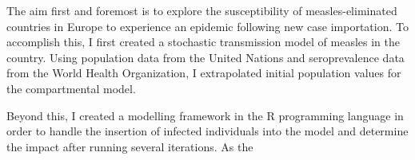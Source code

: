 \documentclass[../Paper.tex]{subfiles}
\begin{document}
  \justifying
  The aim first and foremost is to explore the susceptibility of measles-eliminated
  countries in Europe to experience an epidemic following new case importation.
  To accomplish this, I first created a stochastic transmission model of measles
  in the country. Using population data from the United Nations and seroprevalence data from the World Health Organization,
  I extrapolated initial population values for the compartmental model.

  Beyond this, I created a modelling framework in the R programming language
  in order to handle the insertion of infected individuals into the model and
  determine the impact after running several iterations. As the
  \clearpage
\end{document}

